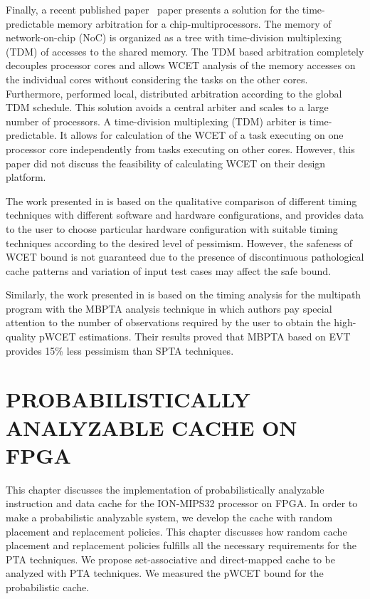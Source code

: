 Finally, a recent published paper~\cite {schoeberl:timememory} paper presents a solution for the time-predictable
memory arbitration for a chip-multiprocessors. The memory of network-on-chip (NoC)
is organized as a tree with time-division multiplexing (TDM) of accesses to the shared
memory. The TDM based arbitration completely decouples processor cores and allows WCET
analysis of the memory accesses on the individual cores without considering the tasks on the other
cores. Furthermore, performed local, distributed arbitration according to the global TDM
schedule. This solution avoids a central arbiter and scales to a large number of processors. A time-division multiplexing (TDM) arbiter is time-predictable.
It allows for calculation of the WCET of a task executing on one processor core independently from tasks executing on other cores. However, this paper did not discuss the feasibility of calculating WCET on their design platform.

The work presented in \cite{abella2014comparison} is based on the qualitative comparison of different timing techniques with different software and hardware configurations, and provides data to the user to choose particular hardware configuration with suitable timing techniques according to the desired level of pessimism. However, the safeness of WCET bound is not guaranteed due to the presence of discontinuous pathological cache patterns and variation of input test cases may affect the safe bound. 



Similarly, the work presented in \cite{cucu:mbpta} is based on the timing analysis for the multipath program with the MBPTA analysis technique in which authors pay special attention to the number of observations required  by the user to obtain the high-quality pWCET estimations. Their results proved that MBPTA based on EVT provides 15\% less pessimism than SPTA techniques.




\section{PROBABILISTICALLY ANALYZABLE CACHE ON FPGA}


This chapter discusses the implementation of probabilistically analyzable instruction and data cache for the ION-MIPS32 processor on
FPGA. In order to make a probabilistic analyzable system, we develop the cache with random placement and replacement policies. This chapter discusses how random cache placement and replacement policies fulfills all the necessary requirements for the PTA techniques. We propose set-associative and direct-mapped cache to be analyzed with PTA techniques. We measured the pWCET bound for the probabilistic cache.

